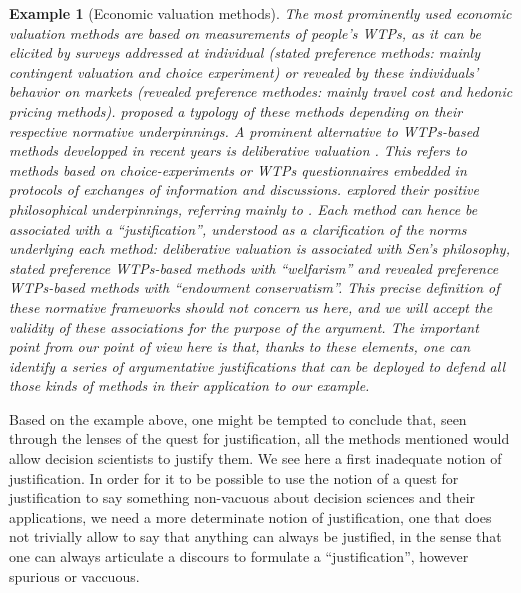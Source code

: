 \documentclass[preprint, french, english, 11pt, authoryear]{elsarticle}%
\newtheorem{example}{Example}
\begin{document}
\begin{example}[Economic valuation methods]
The most prominently used economic valuation methods are based on measurements of people's \acp{WTP}, as it can be elicited by surveys addressed at individual (stated preference methods: mainly contingent valuation and choice experiment) or revealed by these individuals' behavior on markets (revealed preference methodes: mainly travel cost and hedonic pricing methods). \citet{meinard_ethical_2016} proposed a typology of these methods depending on their respective normative underpinnings. A prominent alternative to \acp{WTP}-based methods developped in recent years is deliberative valuation \citep{bartkowski_economic_2017}. This refers to methods based on choice-experiments or \acp{WTP} questionnaires embedded in protocols of exchanges of information and discussions. \citet{bartkowski_beyond_2018} explored their positive philosophical underpinnings, referring mainly to \citet{sen_idea_2009}. Each method can hence be associated with a ``justification'', understood as a clarification of the norms underlying each method: deliberative valuation is associated with Sen's philosophy, stated preference  \acp{WTP}-based methods with ``welfarism'' and revealed preference  \acp{WTP}-based methods with ``endowment conservatism''. This precise definition of these normative frameworks should not concern us here, and we will accept the validity of these associations for the purpose of the argument. The important point from our point of view here is that, thanks to these elements, one can identify a series of argumentative justifications that can be deployed to defend all those kinds of methods in their application to our example.
\end{example}

Based on the example above, one might be tempted to conclude that, seen through the lenses of the quest for justification, all the methods mentioned would allow decision scientists to justify them. We see here a first inadequate notion of justification. In order for it to be possible to use the notion of a quest for justification to say something non-vacuous about decision sciences and their applications, we need a more determinate notion of justification, one that does not trivially allow to say that anything can always be justified, in the sense that one can always articulate a discours to formulate a ``justification'', however spurious or vaccuous.
\end{document}
